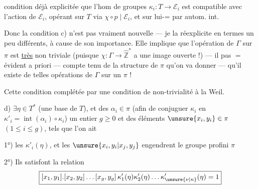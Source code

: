 
condition déjà explicitée que l'hom de groupes \(\kappa_i:T\to\mathcal E_i\)
est compatible avec l'action de \(\mathcal E_i\), opérant sur \(T\) via
\(\chi\circ p\mid\mathcal E_i\), et sur lui-= par autom. int.

Donc la condition c) n'est pas vraiment nouvelle --- je la réexplicite en termes
un peu différents, à cause de son importance. Elle implique que l'opération
de \(\Gamma\) sur \(\pi\) est \uline{très} non triviale (puisque
\(\chi:\Gamma\to\widehat{\mathbb Z}^{*}\) a une image ouverte !)
--- il  pas \(=\) évident a priori
 --- compte tenu de la structure
de \(\pi\) qu'on va donner --- qu'il existe de telles opérations de \(\Gamma\)
sur un \(\pi\) !

Cette condition  complétée par une condition de non-trivialité à la Weil.

d) \(\exists\eta\in T^*\) (une base de \(T\)), et des
\(\alpha_i\in\pi\) (afin de conjuguer \(\kappa_i\) en
\(\kappa'_i=\operatorname{int}(\alpha_i)\circ\kappa_i\))
 un entier \(g\geq0\) et des éléments
\(\unsure{x_i,y_i}\in\pi\) \((1\leq i\leq g)\), tels que l'on ait


1°) les \(\kappa'_i(\eta)\),  et les
\(\unsure{x_i,y_i|x_j,y_j}\) engendrent le groupe profini \(\pi\)

2°) Ils satisfont la relation
\[
\boxed{[x_1,y_1].[x_2,y_2]\ldots[x_g,y_g]\,
\kappa'_1(\eta)\kappa'_2(\eta)\ldots\kappa'_{\unsure{\nu|n}}(\eta)=1}
\]

